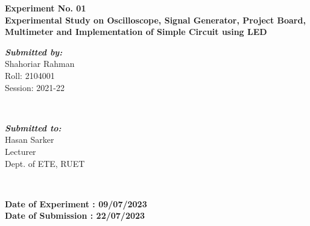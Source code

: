 \begin{titlepage}
\begin{center}
    \textbf{\Large  Experiment No. 01}
    \\[.25cm]
    \textbf{\large Experimental Study on Oscilloscope, Signal Generator, Project Board, Multimeter and Implementation of Simple Circuit using LED}
    \\
    \myrule[1pt][5pt]
    \begin{minipage}{0.4\textwidth}
      \vspace{0.5cm}
      \begin{flushleft}
        \emph{\textbf{\large Submitted by:}}
        \\
        Shahoriar Rahman \\
        Roll: 2104001 \\
        Session: 2021-22
      \end{flushleft}
    \end{minipage}
    ~
    \begin{minipage}{0.4\textwidth}
      \vspace{0.5cm}
      \begin{flushright}
        \emph{\textbf{\large Submitted to:}}
        \\
        Hasan Sarker
        \\
        Lecturer
        \\
        Dept. of ETE, RUET
        \\
      \end{flushright}
    \end{minipage}\\[0.7cm]
    \makeatother

    \textbf{Date of Experiment : 09/07/2023}\\
    \textbf{Date of Submission : 22/07/2023}\\[1cm]




\end{center}
\end{titlepage}
